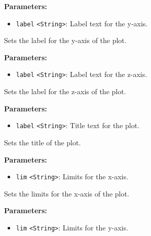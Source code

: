 \documentclass[12pt,a4paper]{article}
\begin{document}
\noindent \textbf{Parameters:}
\begin{itemize}
  \item \texttt{label} \texttt{<String>}: Label text for the y-axis.
\end{itemize}

\noindent Sets the label for the y-axis of the plot.

\vspace{5mm}
\noindent {}


\noindent \textbf{Parameters:}
\begin{itemize}
  \item \texttt{label} \texttt{<String>}: Label text for the z-axis.
\end{itemize}

\noindent Sets the label for the z-axis of the plot.

\vspace{5mm}
\noindent {}


\noindent \textbf{Parameters:}
\begin{itemize}
  \item \texttt{label} \texttt{<String>}: Title text for the plot.
\end{itemize}

\noindent Sets the title of the plot.

\vspace{5mm}
\noindent {}


\noindent \textbf{Parameters:}
\begin{itemize}
  \item \texttt{lim} \texttt{<String>}: Limits for the x-axis.
\end{itemize}

\noindent Sets the limits for the x-axis of the plot.

\vspace{5mm}
\noindent {}


\noindent \textbf{Parameters:}
\begin{itemize}
  \item \texttt{lim} \texttt{<String>}: Limits for the y-axis.
\end{itemize}
\end{document}
